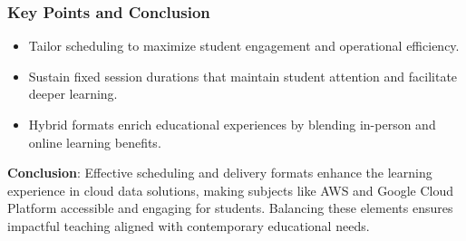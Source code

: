 \documentclass[aspectratio=169]{beamer}
\begin{document}
\begin{frame}[fragile]
    \frametitle{Key Points and Conclusion}
    \begin{itemize}
        \item Tailor scheduling to maximize student engagement and operational efficiency.
        
        \item Sustain fixed session durations that maintain student attention and facilitate deeper learning.
        
        \item Hybrid formats enrich educational experiences by blending in-person and online learning benefits.
    \end{itemize}

    \textbf{Conclusion}:
    Effective scheduling and delivery formats enhance the learning experience in cloud data solutions, making subjects like AWS and Google Cloud Platform accessible and engaging for students. Balancing these elements ensures impactful teaching aligned with contemporary educational needs.
\end{frame}
\end{document}
